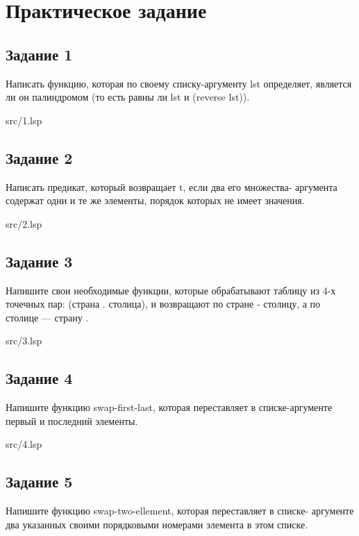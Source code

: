 \chapter*{Практическое задание}

\section*{Задание 1}
Написать функцию, которая по своему списку-аргументу lst определяет, 
является ли он палиндромом (то есть равны ли lst и (reverse lst)).

\FloatBarrier
\begin{lstinputlisting}[style={lsp}]{src/1.lsp}
\end{lstinputlisting}
\FloatBarrier

\section*{Задание 2}
Написать предикат, который возвращает t, если два его множества-
аргумента содержат одни и те же элементы, порядок которых не имеет значения.

\FloatBarrier
\begin{lstinputlisting}[style={lsp}]{src/2.lsp}
\end{lstinputlisting}
\FloatBarrier

\section*{Задание 3}
Напишите свои необходимые функции, которые обрабатывают таблицу из 4-х точечных
пар: (страна . столица), и возвращают по стране - столицу, а по столице — страну .

\FloatBarrier
\begin{lstinputlisting}[style={lsp}]{src/3.lsp}
\end{lstinputlisting}
\FloatBarrier


\section*{Задание 4}
Напишите функцию swap-first-last, которая переставляет в списке-аргументе первый и
последний элементы.

\FloatBarrier
\begin{lstinputlisting}[style={lsp}]{src/4.lsp}
\end{lstinputlisting}
\FloatBarrier

\section*{Задание 5}
Напишите функцию swap-two-ellement, которая переставляет в списке- аргументе два
указанных своими порядковыми номерами элемента в этом списке.

